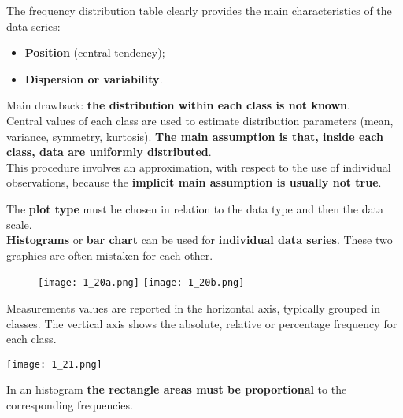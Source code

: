 \begin{frame}
  \begin{small}
    The frequency distribution table clearly provides the main characteristics of the data series:
    \vspace*{.25cm}
    \begin{itemize}
      \item \textbf{Position} (central tendency);
      \item \textbf{Dispersion or variability}.
    \end{itemize}
    \vspace*{.25cm}
    Main drawback: \textbf{the distribution within each class is not known}.\\
    \vspace*{.25cm}
    Central values of each class are used to estimate distribution parameters (mean, variance, symmetry, kurtosis). \textbf{The main assumption is that, inside each class, data are uniformly distributed}.\\
    \vspace*{.25cm}
    This procedure involves an approximation, with respect to the use of individual observations, because the \textbf{implicit main assumption is usually not true}.
  \end{small}
\end{frame}




\begin{frame}
  The \textbf{plot type} must be chosen in relation to the data type and then the data scale.\\
  \vspace*{.5cm}
  \textbf{Histograms} or \textbf{bar chart} can be used for \textbf{individual data series}. These two graphics are often mistaken for each other.
  \vspace*{1.2cm}
  \begin{figure}
    \centering
    \texttt{[image: 1\_20a.png]} \qquad \qquad
    \texttt{[image: 1\_20b.png]}
  \end{figure}
\end{frame}

\begin{frame}
  \vspace*{.25cm}
  Measurements values are reported in the horizontal axis, typically grouped in classes. The vertical axis shows the absolute, relative or percentage frequency for each class.\\
  \vspace*{1cm}
  \begin{floatingfigure}[l]{6cm}
    \texttt{[image: 1\_21.png]}\\
  \end{floatingfigure}
  In an histogram \textbf{the rectangle areas must be proportional} to the corresponding frequencies. \\
\end{frame}

